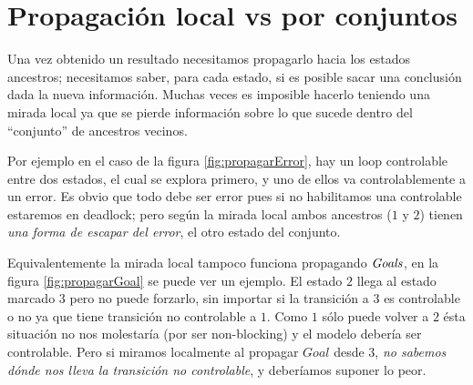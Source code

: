 \section{Propagación local vs por conjuntos}\label{propagacionLocal}

Una vez obtenido un resultado necesitamos propagarlo hacia los estados ancestros; necesitamos saber, para cada estado, si es posible sacar una conclusión dada la nueva información. Muchas veces es imposible hacerlo teniendo una mirada local ya que se pierde información sobre lo que sucede dentro del ``conjunto'' de ancestros vecinos.

Por ejemplo en el caso de la figura \ref{fig:propagarError}, hay un loop controlable entre dos estados, el cual se explora primero, y uno de ellos va controlablemente a un error. Es obvio que todo debe ser error pues si no habilitamos una controlable estaremos en deadlock; pero según la mirada local ambos ancestros ($1$ y $2$) tienen \textit{una forma de escapar del error}, el otro estado del conjunto. 

Equivalentemente la mirada local tampoco funciona propagando $\mathit{Goals}$, en la figura \ref{fig:propagarGoal} se puede ver un ejemplo. El estado $2$ llega al estado marcado $3$ pero no puede forzarlo, sin importar si la transición a $3$ es controlable o no ya que tiene transición no controlable a $1$. Como $1$ sólo puede volver a $2$ ésta situación no nos molestaría (por ser non-blocking) y el modelo debería ser controlable. Pero si miramos localmente al propagar $Goal$ desde $3$, \textit{no sabemos dónde nos lleva la transición no controlable}, y deberíamos suponer lo peor.

